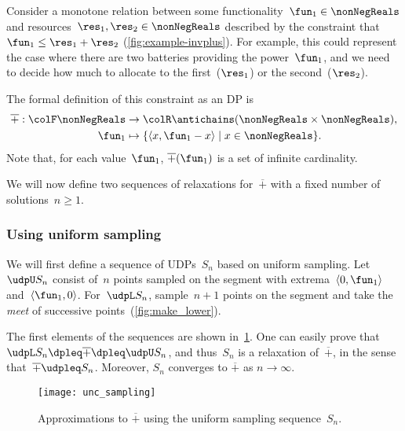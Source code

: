 Consider a monotone relation between some functionality~$\fun_{1}\in\nonNegReals$
and resources~$\res_{1},\res_{2}\in\nonNegReals$ described by
the constraint that~$\fun_{1}\leq\res_{1}+\res_{2}$ (\cref{fig:example-invplus}).
For example, this could represent the case where there are two batteries
providing the power~$\fun_{1}$, and we need to decide how much to
allocate to the first~($\res_{1}$) or the second~($\res_{2}$).


The formal definition of this constraint as an DP is
\begin{align*}
	\overline{+}:{\colF\nonNegReals} & \rightarrow{\colR\antichains(\nonNegReals\times\nonNegReals)},           \\
	\fun_{1}                         & \mapsto\{\left\langle x,\fun_{1}-x\right\rangle \mid x\in\nonNegReals\}.
\end{align*}
Note that, for each value~$\fun_{1}$, $\overline{+}(\fun_{1})$
is a set of infinite cardinality.

We will now define two sequences of relaxations for~$\overline{+}$
with a fixed number of solutions~$n\geq1$.

\subsubsection*{Using uniform sampling}

We will first define a sequence of UDPs~$S_{n}$ based on uniform
sampling.
Let~$\udpU S_{n}$ consist of~$n$ points sampled on the
segment with extrema~$\left\langle 0,\fun_{1}\right\rangle $ and~$\left\langle \fun_{1},0\right\rangle $.
For~$\udpL S_{n}$, sample~$n+1$ points on the segment and take
the \emph{meet} of successive points~(\cref{fig:make_lower}).
\begin{center}
	\par
\end{center}

The first elements of the sequences are shown in~\cref{fig:approx_invplus}.
One can easily prove that $\udpL S_{n}\dpleq\overline{+}\dpleq\udpU S_{n}$,
and thus~$S_{n}$ is a relaxation of~$\overline{+}$, in the sense
that~$\overline{+}\udpleq S_{n}$.
Moreover, $S_{n}$ converges to
$\overline{+}$ as $n\rightarrow\infty$.

\begin{figure}[h]
	\centering
	\texttt{[image: unc\_sampling]}
	\caption{Approximations to $\overline{+}$ using
		the uniform sampling sequence~$S_{n}$. }
	\label{fig:approx_invplus}
\end{figure}

